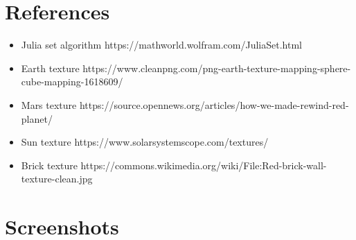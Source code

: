 \documentclass[10pt]{article}
\begin{document}
    \section{References}
    \begin{itemize}
        \item Julia set algorithm https://mathworld.wolfram.com/JuliaSet.html
        \item Earth texture https://www.cleanpng.com/png-earth-texture-mapping-sphere-cube-mapping-1618609/
        \item Mars texture https://source.opennews.org/articles/how-we-made-rewind-red-planet/
        \item Sun texture https://www.solarsystemscope.com/textures/
        \item Brick texture https://commons.wikimedia.org/wiki/File:Red-brick-wall-texture-clean.jpg
    \end{itemize}

    \section{Screenshots}
\end{document}
